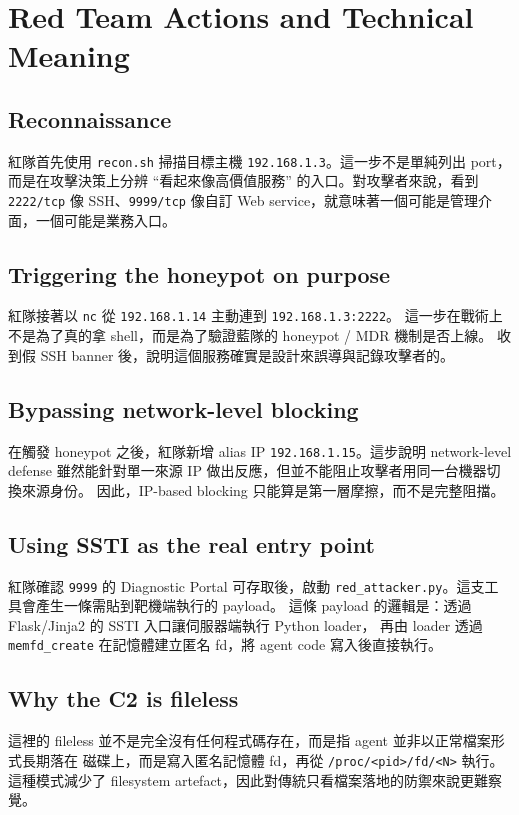\documentclass[UTF8,11pt]{ctexart}
\begin{document}
\section{Red Team Actions and Technical Meaning}

\subsection{Reconnaissance}
紅隊首先使用 \texttt{recon.sh} 掃描目標主機 \texttt{192.168.1.3}。這一步不是單純列出 port，
而是在攻擊決策上分辨 ``看起來像高價值服務'' 的入口。對攻擊者來說，看到 \texttt{2222/tcp}
像 SSH、\texttt{9999/tcp} 像自訂 Web service，就意味著一個可能是管理介面，一個可能是業務入口。

\subsection{Triggering the honeypot on purpose}
紅隊接著以 \texttt{nc} 從 \texttt{192.168.1.14} 主動連到 \texttt{192.168.1.3:2222}。
這一步在戰術上不是為了真的拿 shell，而是為了驗證藍隊的 honeypot / MDR 機制是否上線。
收到假 SSH banner 後，說明這個服務確實是設計來誤導與記錄攻擊者的。

\subsection{Bypassing network-level blocking}
在觸發 honeypot 之後，紅隊新增 alias IP \texttt{192.168.1.15}。這步說明 network-level defense
雖然能針對單一來源 IP 做出反應，但並不能阻止攻擊者用同一台機器切換來源身份。
因此，IP-based blocking 只能算是第一層摩擦，而不是完整阻擋。

\subsection{Using SSTI as the real entry point}
紅隊確認 \texttt{9999} 的 Diagnostic Portal 可存取後，啟動
\texttt{red\_attacker.py}。這支工具會產生一條需貼到靶機端執行的 payload。
這條 payload 的邏輯是：透過 Flask/Jinja2 的 SSTI 入口讓伺服器端執行 Python loader，
再由 loader 透過 \texttt{memfd\_create} 在記憶體建立匿名 fd，將 agent code 寫入後直接執行。

\subsection{Why the C2 is fileless}
這裡的 fileless 並不是完全沒有任何程式碼存在，而是指 agent 並非以正常檔案形式長期落在
磁碟上，而是寫入匿名記憶體 fd，再從 \texttt{/proc/<pid>/fd/<N>} 執行。這種模式減少了
filesystem artefact，因此對傳統只看檔案落地的防禦來說更難察覺。
\end{document}
